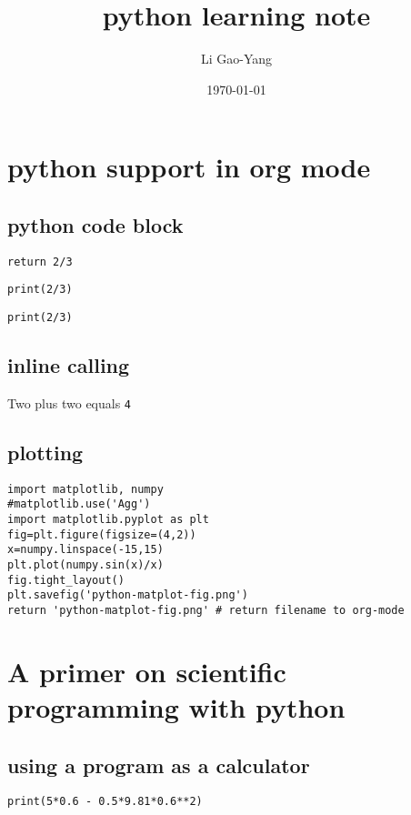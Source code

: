 \documentclass[11pt]{article}
\author{Li Gao-Yang}
\date{\today}
\title{python learning note}
\begin{document}
\maketitle
\tableofcontents

\section{python support in org mode}
\label{sec:orgf1ebe3f}
\subsection{python code block}
\label{sec:org0e220ff}
\begin{verbatim}
return 2/3
\end{verbatim}

\begin{verbatim}
print(2/3)
\end{verbatim}

\begin{verbatim}
print(2/3)
\end{verbatim}

\subsection{inline calling}
\label{sec:org706d256}
Two plus two equals \texttt{4}
\subsection{plotting}
\label{sec:org9421ce3}
\begin{verbatim}
import matplotlib, numpy
#matplotlib.use('Agg')
import matplotlib.pyplot as plt
fig=plt.figure(figsize=(4,2))
x=numpy.linspace(-15,15)
plt.plot(numpy.sin(x)/x)
fig.tight_layout()
plt.savefig('python-matplot-fig.png')
return 'python-matplot-fig.png' # return filename to org-mode
\end{verbatim}

\section{A primer on scientific programming with python}
\label{sec:orgd2fc477}
\subsection{using a program as a calculator}
\label{sec:org724ffad}
\begin{verbatim}
print(5*0.6 - 0.5*9.81*0.6**2)
\end{verbatim}
\end{document}
